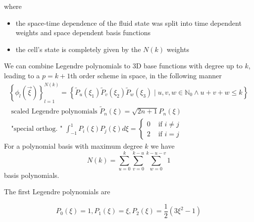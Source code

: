 where
\begin{itemize}
    \item the space-time dependence of the fluid state was split into time dependent weights and space dependent basis functions
    \item the cell's state is completely given by the $N(k)$ weights
\end{itemize}

We can combine Legendre polynomials to 3D base functions with degree up to $k$, leading to a $p=k+1$th order
scheme in space, in the following manner
\begin{equation}
    \begin{gathered}
        \left\{\phi_l(\vec{\xi})\right\}_{l=1}^{N(k)}=\left\{\tilde{P}_u\left(\xi_1\right) \tilde{P}_v\left(\xi_2\right) \tilde{P}_w\left(\xi_3\right) \mid u, v, w \in \mathbb{N}_0 \wedge u+v+w \leq k\right\} \\
        \text { scaled Legendre polynomials } \tilde{P}_n(\xi)=\sqrt{2 n+1} P_n(\xi) \\
        \text { "special orthog. " } \int_{-1}^1 P_i(\xi) P_j(\xi) d \xi= \begin{cases}0 & \text { if } i \neq j \\ 2 & \text { if } i=j\end{cases}
    \end{gathered}
\end{equation}
For a polynomial basis with maximum degree $k$ we have
\begin{equation}
    N(k)=\sum_{u=0}^k \sum_{v=0}^{k-u} \sum_{w=0}^{k-u-v} 1
\end{equation}
basis polynomials.

The first Legendre polynomials are

\begin{equation}
    P_0(\xi)=1, P_1(\xi)=\xi, P_2(\xi) = \frac{1}{2}\left(3 \xi^2-1\right)
\end{equation}


